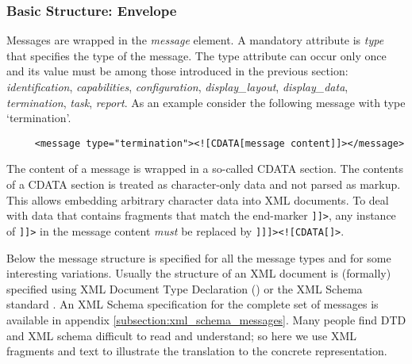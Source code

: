 \documentclass{article}
\begin{document}

   \subsubsection{Basic Structure: Envelope} \label{ss:structure}

    \noindent Messages are wrapped in the \textit{message} element. A mandatory
    attribute is \textit{type} that specifies the type of the message. The type
    attribute can occur only once and its value must be among those introduced
    in the previous section: \textit{identification}, \textit{capabilities},
    \textit{configuration}, \textit{display\_layout}, \textit{display\_data},
    \textit{termination}, \textit{task},
    \textit{report}. As an example consider the following message with type
    `termination'.
 
    \begin{verbatim}
     <message type="termination"><![CDATA[message content]]></message>\end{verbatim}

    \noindent The content of a message is wrapped in a so-called CDATA section. The
    contents of a CDATA section is treated as character-only data and not
    parsed as markup. This allows embedding arbitrary character data into XML
    documents. To deal with data that contains fragments that match the
    end-marker \verb']]>', any instance of \verb']]>' in the message content
    \textit{must} be replaced by \verb']]]><![CDATA[]>'.
    
    \noindent Below the message structure is specified for all the
    message types and for some interesting variations. Usually the structure
    of an XML document is (formally) specified using XML Document Type
    Declaration (\cite{Sperberg-McQueen:06:EML}) or the XML Schema standard
    \cite{Malhotra:06:XSP}. An XML Schema specification for the complete set of
    messages is available in appendix \ref{subsection:xml_schema_messages}. Many people
    find DTD and XML schema difficult to read and understand; so here we use 
    XML fragments and text to illustrate the translation to the
    concrete representation.
\end{document}
